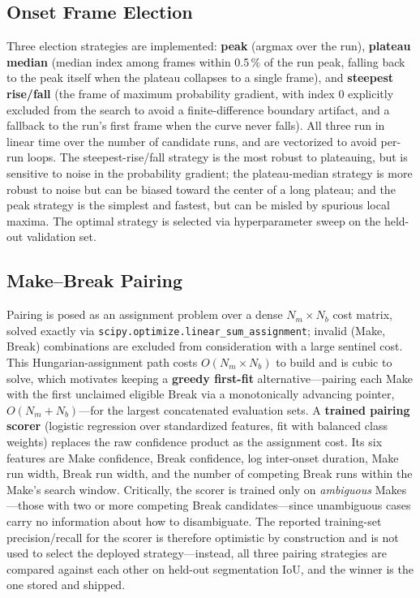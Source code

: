 \subsection{Onset Frame Election}
Three election strategies are implemented: \textbf{peak} (argmax over the run), \textbf{plateau median} (median index among frames within 0.5\,\% of the run peak, falling back to the peak itself when the plateau collapses to a single frame), and \textbf{steepest rise/fall} (the frame of maximum probability gradient, with index 0 explicitly excluded from the search to avoid a finite-difference boundary artifact, and a fallback to the run's first frame when the curve never falls). All three run in linear time over the number of candidate runs, and are vectorized to avoid per-run loops. The steepest-rise/fall strategy is the most robust to plateauing, but is sensitive to noise in the probability gradient; the plateau-median strategy is more robust to noise but can be biased toward the center of a long plateau; and the peak strategy is the simplest and fastest, but can be misled by spurious local maxima. The optimal strategy is selected via hyperparameter sweep on the held-out validation set.

\subsection{Make--Break Pairing}
Pairing is posed as an assignment problem over a dense $N_m \times N_b$ cost matrix, solved exactly via \texttt{scipy.optimize.linear\_sum\_assignment}; invalid (Make, Break) combinations are excluded from consideration with a large sentinel cost. This Hungarian-assignment path costs $O(N_m \times N_b)$ to build and is cubic to solve, which motivates keeping a \textbf{greedy first-fit} alternative---pairing each Make with the first unclaimed eligible Break via a monotonically advancing pointer, $O(N_m + N_b)$---for the largest concatenated evaluation sets. A \textbf{trained pairing scorer} (logistic regression over standardized features, fit with balanced class weights) replaces the raw confidence product as the assignment cost. Its six features are Make confidence, Break confidence, log inter-onset duration, Make run width, Break run width, and the number of competing Break runs within the Make's search window. Critically, the scorer is trained only on \emph{ambiguous} Makes---those with two or more competing Break candidates---since unambiguous cases carry no information about how to disambiguate. The reported training-set precision/recall for the scorer is therefore optimistic by construction and is not used to select the deployed strategy---instead, all three pairing strategies are compared against each other on held-out segmentation IoU, and the winner is the one stored and shipped.

